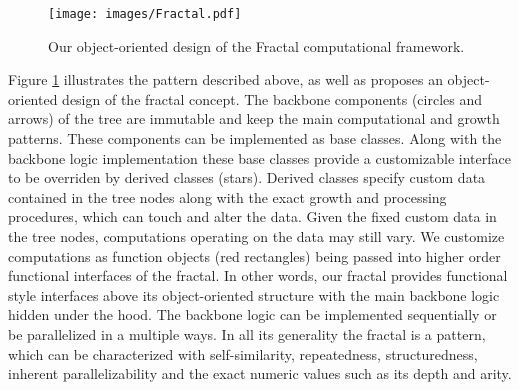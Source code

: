 \begin{figure}[!htb]
\texttt{[image: images/Fractal.pdf]}
\caption{Our object-oriented design of the Fractal computational framework.}
\label{fig:fractal_scheme}
\end{figure}
Figure \ref{fig:fractal_scheme} illustrates the pattern described above, as well as proposes an object-oriented design of the fractal concept. The backbone components (circles and arrows) of the tree are immutable and keep the main computational and growth patterns. These components can be implemented as base classes. Along with the backbone logic implementation these base classes provide a customizable interface to be overriden by derived classes (stars). Derived classes specify custom data contained in the tree nodes along with the exact growth and processing procedures, which can touch and alter the data. Given the fixed custom data in the tree nodes, computations operating on the data may still vary. We customize computations as function objects (red rectangles) being passed into higher order functional interfaces of the fractal. In other words, our fractal provides functional style interfaces above its object-oriented structure with the main backbone logic hidden under the hood. The backbone logic can be implemented sequentially or be parallelized in a multiple ways. In all its generality the fractal is a pattern, which can be characterized with self-similarity, repeatedness, structuredness, inherent parallelizability and the exact numeric values such as its depth and arity.
